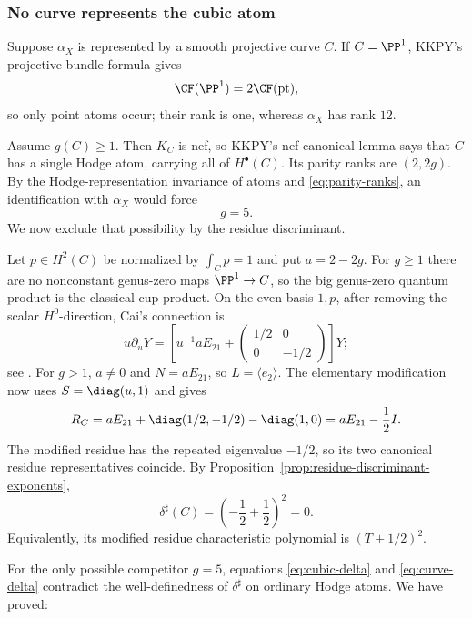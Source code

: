 \subsubsection{No curve represents the cubic atom}

Suppose $\alpha_X$ is represented by a smooth projective curve $C$.
If $C=\PP^1$, KKPY's projective-bundle formula gives
\[
  \CF(\PP^1)=2\CF(\mathrm{pt}),
\]
so only point atoms occur; their rank is one, whereas $\alpha_X$ has rank
$12$.

Assume $g(C)\ge1$.  Then $K_C$ is nef, so KKPY's nef-canonical lemma says
that $C$ has a single Hodge atom, carrying all of $H^\bullet(C)$.  Its parity
ranks are $(2,2g)$.  By the Hodge-representation invariance of atoms and
\eqref{eq:parity-ranks}, an identification with $\alpha_X$ would force
\begin{equation}\label{eq:g5}
  g=5.
\end{equation}
We now exclude that possibility by the residue discriminant.

Let $p\in H^2(C)$ be normalized by $\int_Cp=1$ and put $a=2-2g$.
For $g\ge1$ there are no nonconstant genus-zero maps $\PP^1\to C$, so the
big genus-zero quantum product is the classical cup product.  On the even
basis $1,p$, after removing the scalar $H^0$-direction, Cai's connection is
\begin{equation}\label{eq:curve-connection}
 u\partial_uY=
 \left[
  u^{-1}aE_{21}+\begin{pmatrix}1/2&0\\0&-1/2\end{pmatrix}
 \right]Y;
\end{equation}
see \cite[\S4]{Cai}.  For $g>1$, $a\ne0$ and
$N=aE_{21}$, so $L=\langle e_2\rangle$.  The elementary modification now
uses $S=\diag(u,1)$ and gives
\begin{equation}\label{eq:RC}
  R_C
  =aE_{21}+\diag(1/2,-1/2)-\diag(1,0)
  =aE_{21}-\frac12I.
\end{equation}
The modified residue has the repeated eigenvalue $-1/2$, so its two
canonical residue representatives coincide.  By
Proposition~\ref{prop:residue-discriminant-exponents},
\begin{equation}\label{eq:curve-delta}
  \boxed{\delta^\sharp(C)
    =\left(-\frac12+\frac12\right)^2=0.}
\end{equation}
Equivalently, its modified residue characteristic polynomial is
$(T+1/2)^2$.

For the only possible competitor $g=5$, equations
\eqref{eq:cubic-delta} and \eqref{eq:curve-delta} contradict the
well-definedness of $\delta^\sharp$ on ordinary Hodge atoms.  We have proved:

